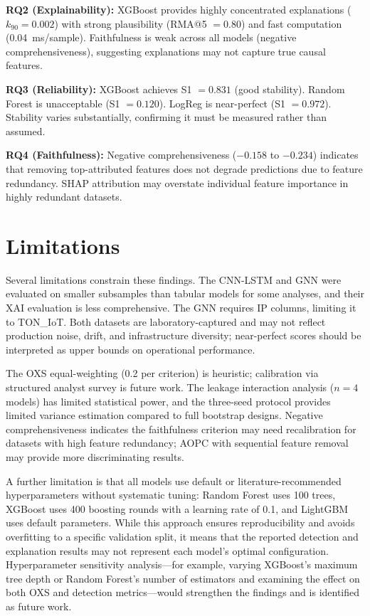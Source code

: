 \documentclass[12pt,a4paper]{report}
\begin{document}
\textbf{RQ2 (Explainability):} XGBoost provides highly concentrated explanations ($k_{90} = 0.002$) with strong plausibility (RMA@5 $= 0.80$) and fast computation (0.04~ms/sample). Faithfulness is weak across all models (negative comprehensiveness), suggesting explanations may not capture true causal features.

\textbf{RQ3 (Reliability):} XGBoost achieves S1 $= 0.831$ (good stability). Random Forest is unacceptable (S1 $= 0.120$). LogReg is near-perfect (S1 $= 0.972$). Stability varies substantially, confirming it must be measured rather than assumed.

\textbf{RQ4 (Faithfulness):} Negative comprehensiveness ($-0.158$ to $-0.234$) indicates that removing top-attributed features does not degrade predictions due to feature redundancy. SHAP attribution may overstate individual feature importance in highly redundant datasets.

\section{Limitations}
\label{sec:limitations}

Several limitations constrain these findings. The CNN-LSTM and GNN were evaluated on smaller subsamples than tabular models for some analyses, and their XAI evaluation is less comprehensive. The GNN requires IP columns, limiting it to TON\_IoT. Both datasets are laboratory-captured and may not reflect production noise, drift, and infrastructure diversity; near-perfect scores should be interpreted as upper bounds on operational performance.

The OXS equal-weighting (0.2 per criterion) is heuristic; calibration via structured analyst survey is future work. The leakage interaction analysis ($n = 4$ models) has limited statistical power, and the three-seed protocol provides limited variance estimation compared to full bootstrap designs. Negative comprehensiveness indicates the faithfulness criterion may need recalibration for datasets with high feature redundancy; AOPC with sequential feature removal may provide more discriminating results.

A further limitation is that all models use default or literature-recommended hyperparameters without systematic tuning: Random Forest uses 100 trees, XGBoost uses 400 boosting rounds with a learning rate of 0.1, and LightGBM uses default parameters. While this approach ensures reproducibility and avoids overfitting to a specific validation split, it means that the reported detection and explanation results may not represent each model's optimal configuration. Hyperparameter sensitivity analysis---for example, varying XGBoost's maximum tree depth or Random Forest's number of estimators and examining the effect on both OXS and detection metrics---would strengthen the findings and is identified as future work.
\end{document}
